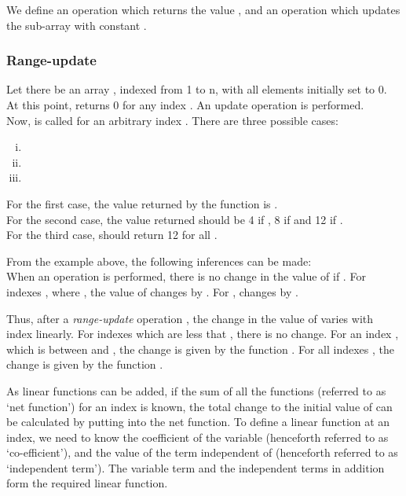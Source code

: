 \documentclass[a4paper]{article}
\begin{document}
\vspace{-5 mm}


We define an operation  which returns the value , and an operation  which updates the sub-array  with constant .

\subsubsection{Range-update}
Let there be an array , indexed from 1 to n, with all elements initially set to 0. At this point,  returns 0 for any index . An update operation  is performed.\\
Now,  is called for an arbitrary index . There are three possible cases:
\begin{enumerate}[i.]
\vspace{-2 mm}
\item 
\item 
\item 
\end{enumerate}

\vspace{1 mm}
\noindent
For the first case, the value returned by the function  is .\\
For the second case, the value returned should be 4 if , 8 if  and 12 if .\\
For the third case,  should return 12 for all .

\vspace{2 mm}
From the example above, the following inferences can be made:\\
When an operation  is performed, there is no change in the value of  if  . For indexes , where , the value of  changes by . For ,  changes by .

\vspace{2 mm}
Thus, after a \textit{range-update} operation , the change in the value of  varies with index  linearly. For indexes which are less that , there is no change. For an index , which is between  and , the change is given by the function . For all indexes , the change is given by the function .

\vspace{2 mm}
As linear functions can be added, if the sum of all the functions (referred to as `net function') for an index  is known, the total change to the initial value of  can be calculated by putting  into the net function. To define a linear function at an index, we need to know the coefficient of the variable  (henceforth referred to as `co-efficient'), and the value of the term independent of  (henceforth referred to as `independent term'). The variable term and the independent terms in addition form the required linear function.
\end{document}

